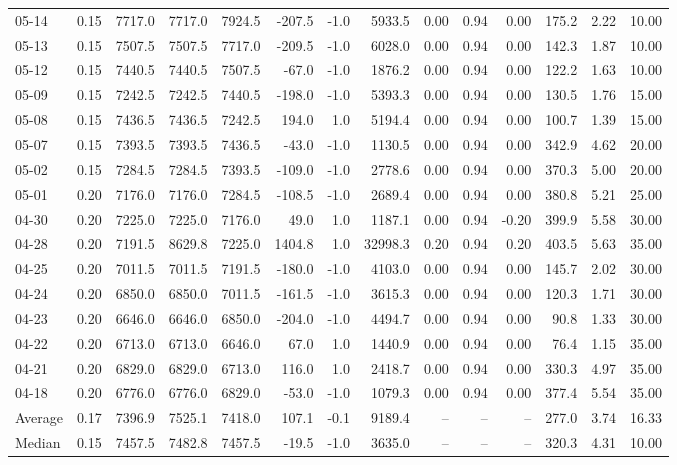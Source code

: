 \begin{threeparttable}
{\begin{tabular}{lrrrrrrrrrrrrr}
05-14 & 0.15 & 7717.0 & 7717.0 & 7924.5 & -207.5 & -1.0 & 5933.5 & 0.00 & 0.94 & 0.00 & 175.2 & 2.22 & 10.00 \\
05-13 & 0.15 & 7507.5 & 7507.5 & 7717.0 & -209.5 & -1.0 & 6028.0 & 0.00 & 0.94 & 0.00 & 142.3 & 1.87 & 10.00 \\
05-12 & 0.15 & 7440.5 & 7440.5 & 7507.5 & -67.0 & -1.0 & 1876.2 & 0.00 & 0.94 & 0.00 & 122.2 & 1.63 & 10.00 \\
05-09 & 0.15 & 7242.5 & 7242.5 & 7440.5 & -198.0 & -1.0 & 5393.3 & 0.00 & 0.94 & 0.00 & 130.5 & 1.76 & 15.00 \\
05-08 & 0.15 & 7436.5 & 7436.5 & 7242.5 & 194.0 & 1.0 & 5194.4 & 0.00 & 0.94 & 0.00 & 100.7 & 1.39 & 15.00 \\
05-07 & 0.15 & 7393.5 & 7393.5 & 7436.5 & -43.0 & -1.0 & 1130.5 & 0.00 & 0.94 & 0.00 & 342.9 & 4.62 & 20.00 \\
05-02 & 0.15 & 7284.5 & 7284.5 & 7393.5 & -109.0 & -1.0 & 2778.6 & 0.00 & 0.94 & 0.00 & 370.3 & 5.00 & 20.00 \\
05-01 & 0.20 & 7176.0 & 7176.0 & 7284.5 & -108.5 & -1.0 & 2689.4 & 0.00 & 0.94 & 0.00 & 380.8 & 5.21 & 25.00 \\
04-30 & 0.20 & 7225.0 & 7225.0 & 7176.0 & 49.0 & 1.0 & 1187.1 & 0.00 & 0.94 & -0.20 & 399.9 & 5.58 & 30.00 \\
04-28 & 0.20 & 7191.5 & 8629.8 & 7225.0 & 1404.8 & 1.0 & 32998.3 & 0.20 & 0.94 & 0.20 & 403.5 & 5.63 & 35.00 \\
04-25 & 0.20 & 7011.5 & 7011.5 & 7191.5 & -180.0 & -1.0 & 4103.0 & 0.00 & 0.94 & 0.00 & 145.7 & 2.02 & 30.00 \\
04-24 & 0.20 & 6850.0 & 6850.0 & 7011.5 & -161.5 & -1.0 & 3615.3 & 0.00 & 0.94 & 0.00 & 120.3 & 1.71 & 30.00 \\
04-23 & 0.20 & 6646.0 & 6646.0 & 6850.0 & -204.0 & -1.0 & 4494.7 & 0.00 & 0.94 & 0.00 & 90.8 & 1.33 & 30.00 \\
04-22 & 0.20 & 6713.0 & 6713.0 & 6646.0 & 67.0 & 1.0 & 1440.9 & 0.00 & 0.94 & 0.00 & 76.4 & 1.15 & 35.00 \\
04-21 & 0.20 & 6829.0 & 6829.0 & 6713.0 & 116.0 & 1.0 & 2418.7 & 0.00 & 0.94 & 0.00 & 330.3 & 4.97 & 35.00 \\
04-18 & 0.20 & 6776.0 & 6776.0 & 6829.0 & -53.0 & -1.0 & 1079.3 & 0.00 & 0.94 & 0.00 & 377.4 & 5.54 & 35.00 \\
Average & 0.17 & 7396.9 & 7525.1 & 7418.0 & 107.1 & -0.1 & 9189.4 & -- & -- & -- & 277.0 & 3.74 & 16.33 \\
Median & 0.15 & 7457.5 & 7482.8 & 7457.5 & -19.5 & -1.0 & 3635.0 & -- & -- & -- & 320.3 & 4.31 & 10.00 \\

\end{tabular}}
\end{threeparttable}
